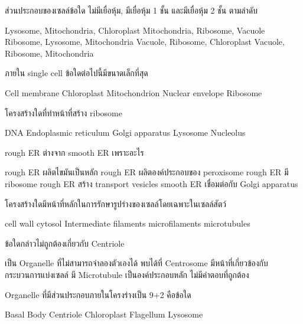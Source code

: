 \begin{questions}
\filbreak
  \question ส่วนประกอบของเซลล์ข้อใด ไม่มีเยื่อหุ้ม, มีเยื่อหุ้ม 1 ชั้น และมีเยื่อหุ้ม 2 ชั้น ตามลำดับ
  \begin{choices}
    \choice Lysosome, Mitochondria, Chloroplast
    \choice Mitochondria, Ribosome, Vacuole
    \choice Ribosome, Lysosome, Mitochondria
    \choice Vacuole, Ribosome, Chloroplast
    \choice Vacuole, Ribosome, Mitochondria
\end{choices}

\filbreak
  \question ภายใน single cell ข้อใดต่อไปนี้มีขนาดเล็กที่สุด
  \begin{choices}
    \choice Cell membrane
    \choice Chloroplast
    \choice Mitochondrion
    \choice Nuclear envelope
    \choice Ribosome
\end{choices}

\filbreak
  \question โครงสร้างใดที่ทำหน้าที่สร้าง ribosome
  \begin{choices}
    \choice DNA
    \choice Endoplasmic reticulum
    \choice Golgi apparatus
    \choice Lysosome
    \choice Nucleolus
\end{choices}

\filbreak
  \question rough ER ต่างจาก smooth ER เพราะอะไร
  \begin{choices}
    \choice rough ER ผลิตไขมันเป็นหลัก
    \choice rough ER ผลิตองค์ประกอบของ peroxisome
    \choice rough ER มี ribosome
    \choice rough ER สร้าง transport vesicles
    \choice smooth ER เชื่อมต่อกับ Golgi apparatus
\end{choices}

\filbreak
  \question โครงสร้างใดมีหน้าที่หลักในการรักษารูปร่างของเซลล์โดยเฉพาะในเซลล์สัตว์
  \begin{choices}
    \choice cell wall
    \choice cytosol
    \choice Intermediate filaments
    \choice microfilaments
    \choice microtubules
\end{choices}

\filbreak
  \question ข้อใดกล่าวไม่ถูกต้องเกี่ยวกับ Centriole
  \begin{choices}
    \choice เป็น Organelle ที่ไม่สามารถจำลองตัวเองได้
    \choice พบได้ที่ Centrosome
    \choice มีหน้าที่เกี่ยวข้องกับกระบวนการแบ่งเซลล์
    \choice มี Microtubule เป็นองค์ประกอบหลัก
    \choice ไม่มีคำตอบที่ถูกต้อง
\end{choices}

\filbreak
  \question Organelle ที่มีส่วนประกอบภายในโครงร่างเป็น 9+2 คือข้อใด
  \begin{choices}
    \choice Basal Body
    \choice Centriole
    \choice Chloroplast
    \choice Flagellum
    \choice Lysosome
\end{choices}


\end{questions}
